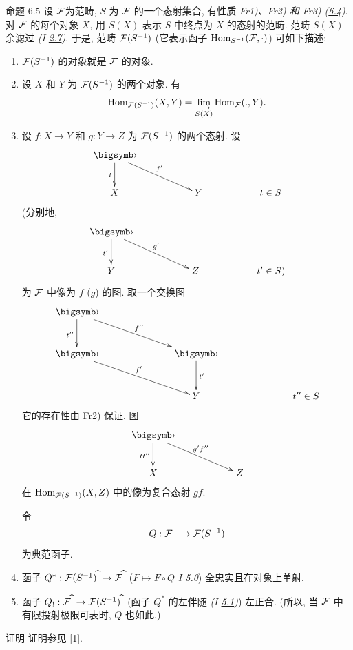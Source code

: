 \begin{enonce*}{命题 6.5}
设 ${\mathcal F}$\pageoriginale 为范畴,
$S$ 为 ${\mathcal F}$ 的一个态射集合, 有性质 \emph{Fr1)、Fr2) 和 Fr3)
(\hyperref[VI.prop6.4]{6.4})}.
对 ${\mathcal F}$ 的每个对象 $X$, 用 $S(X)$ 表示 $S$ 中终点为 $X$ 的态射的范畴.
范畴 $S(X)$ 余滤过 \emph{(I \hyperref[I.def2.7]{2.7})}.
于是, 范畴 ${\mathcal F}(S^{-1})$ (它表示函子 $\operatorname{Hom}_{S^{-1}}({\mathcal F},\cdot)$)
可如下描述:
\begin{enumerate}
\renewcommand{\theenumi}{\alph{enumi}}
\renewcommand{\labelenumi}{\theenumi)}
\item ${\mathcal F}(S^{-1})$ 的对象就是 ${\mathcal F}$ 的对象.

\item 设 $X$ 和 $Y$ 为 ${\mathcal F}(S^{-1})$ 的两个对象. 有
$$
\operatorname{Hom}_{{\mathcal F}(S^{-1})} (X, Y)= \varinjlim_{S(X)}
\operatorname{Hom}_{{\mathcal F}} (., Y){}.
$$

\item 设 $f:X\to Y$ 和 $g:Y\to Z$ 为 ${\mathcal F}(S^{-1})$ 的两个态射.
设
\[
\xymatrix{
\bigdot  \ar[d]_{t} \ar[rrd]^{f'}&\\
X        & &Y & & t\in S
}
\]
(分别地,
\[
\xymatrix{
\bigdot \ar[d]_{t'} \ar[rrd]^{g'}&\\
Y                          & & Z & & t'\in S)
}
\]
为 ${\mathcal F}$ 中像为 $f$ (\resp $g$) 的图.
取一个交换图
\[
\xymatrix@C=2.5cm@R=1cm{
\bigdot \ar[rd]^{f''} \ar[d]_{t''}& \\
\bigdot \ar[rd]^{f'}        & \bigdot \ar[d]^{t'}\\
                            & Y      & t''\in S
}
\]
它的存在性由 Fr2) 保证.
图
\[
\xymatrix@C=2cm{
\bigdot \ar[d]_{tt''} \ar[rd]^{g'f''}& \\
X       & Z
}
\]
在 $\operatorname{Hom}_{{\mathcal F}(S^{-1})}(X,Z)$ 中的像为复合态射 $gf$.

令\pageoriginale
$$
Q : \Ff \to \Ff (S^{-1})
$$
为典范函子.

\item 函子 $Q^{\ast}:\Ff(S^{-1})^{\widehat{\phantom{,}}}\to
  \Ff^{\widehat{\phantom{,}}}$ ($F\mapsto F\circ Q$ \emph{I \hyperref[I.sec5.0]{5.0}})
全忠实且在对象上单射.

\item 函子 $Q_{!}:\Ff^{\widehat{\phantom{,}}}\to
  \Ff(S^{-1})^{\widehat{\phantom{,}}}$
(函子 $Q^{\ast}$ 的左伴随 \emph{(I \hyperref[I.prop5.1]{5.1})}) 左正合.
(所以, 当 ${\mathcal F}$ 中有限投射极限可表时, $Q$ 也如此.)
\end{enumerate}
\end{enonce*}

\begin{enonce*}[remark]{证明}
证明参见 [1].
\end{enonce*}

